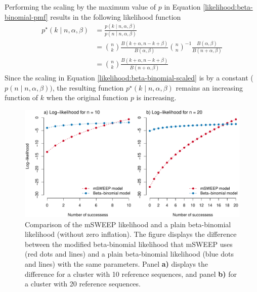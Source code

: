 \documentclass[officiallayout]{tktla}
\let\svthefootnote\thefootnote
\begin{document}
Performing the scaling by the maximum value of $p$ in Equation
\ref{likelihood:beta-binomial-pmf} results in the following likelihood
function
\begin{equation}
  \label{likelihood:beta-binomial-scaled}
  \begin{aligned}
    p^{\star}\left(k \middle| n, \alpha, \beta\right) &= \frac{p\left(k \middle| n, \alpha, \beta\right)}{p\left(n \middle| n, \alpha, \beta\right)} \\
    &= \binom{n}{k}\frac{B\left(k + \alpha, n - k + \beta\right)}{B\left(\alpha, \beta\right)} \binom{n}{n}^{-1}\frac{B\left(\alpha, \beta\right)}{B\left(n + \alpha, \beta\right)} \\
    &= \binom{n}{k}\frac{B\left(k + \alpha, n - k + \beta\right)}{B\left(n + \alpha, \beta\right)}
  \end{aligned}
\end{equation}
Since the scaling in Equation \ref{likelihood:beta-binomial-scaled} is
by a constant ($p\left(n \middle| n, \alpha, \beta\right))$, the
resulting function $p^{\star}\left(k \middle| n, \alpha, \beta\right)$
remains an increasing function of $k$ when the original function $p$
is increasing.

\addtocounter{footnote}{-1}\let\thefootnote\svthefootnote
\begin{figure}[!h]
  \label{fig:msweep-vs-beta-binomial}
    \centering
    \includegraphics[width=\textwidth,keepaspectratio]{img/mSWEEP_likelihood.pdf}
    \caption{Comparison of the mSWEEP likelihood and a plain beta-binomial likelihood (without zero inflation). The figure displays the difference between the modified beta-binomial likelihood that mSWEEP uses (red dots and lines) and a plain beta-binomial likelihood (blue dots and lines) with the same parameters. Panel \textbf{a)} displays the difference for a cluster with 10 reference sequences, and panel \textbf{b)} for a cluster with 20 reference sequences.}
\end{figure}
\end{document}

